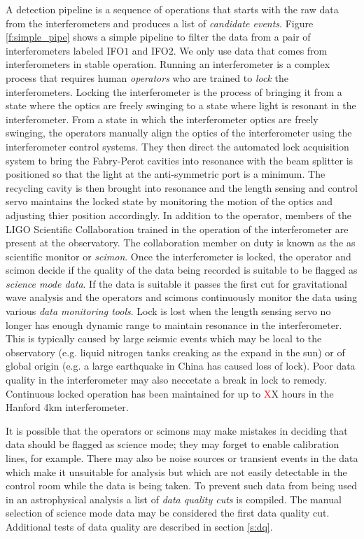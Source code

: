 A detection pipeline is a sequence of operations that starts with the raw data
from the interferometers and produces a list of \emph{candidate events}.
Figure \ref{f:simple_pipe} shows a simple pipeline to filter the data from a
pair of interferometers labeled IFO$1$ and IFO$2$.
We only use data that comes from interferometers in stable operation. Running
an interferometer is a complex process that requires human \emph{operators}
who are trained to \emph{lock} the interferometers. Locking the interferometer
is the process of bringing it from a state where the optics are freely
swinging to a state where light is resonant in the interferometer.  From a
state in which the interferometer optics are freely swinging, the operators
manually align the optics of the interferometer using the interferometer
control systems. They then direct the automated lock acquisition
system\cite{Evans:thesis} to bring the Fabry-Perot cavities into resonance
with the beam splitter is positioned so that the light at the anti-symmetric
port is a minimum. The recycling cavity is then brought into resonance and the
length sensing and control servo maintains the locked state by monitoring the
motion of the optics and adjusting thier position accordingly.   In addition
to the operator, members of the LIGO Scientific Collaboration trained in the
operation of the interferometer are present at the observatory. The
collaboration member on duty is known as the as scientific monitor or
\emph{scimon}. Once the interferometer is locked, the operator and scimon
decide if the quality of the data being recorded is suitable to be flagged as
\emph{science mode data}. If the data is suitable it passes the first cut for
gravitational wave analysis and the operators and scimons continuously monitor
the data using various \emph{data monitoring tools}. Lock is lost
when the length sensing servo no longer has enough dynamic range to maintain
resonance in the interferometer. This is typically caused by large seismic
events which may be local to the observatory (e.g. liquid nitrogen tanks
creaking as the expand in the sun) or of global origin (e.g. a large
earthquake in China has caused loss of lock). Poor data quality in the
interferometer may also neccetate a break in lock to remedy.  Continuous
locked operation has been maintained for up to {\textcolor{red} XX} hours in
the Hanford 4km interferometer.

It is possible that the operators or scimons may make mistakes in deciding
that data should be flagged as science mode; they may forget to enable
calibration lines, for example. There may also be noise sources or transient
events in the data which make it unsuitable for analysis but which are not
easily detectable in the control room while the data is being taken. To
prevent such data from being used in an astrophysical analysis a list of
\emph{data quality cuts} is compiled. The manual selection of science mode
data may be considered the first data quality cut.  Additional tests of data
quality are described in section \ref{s:dq}.

